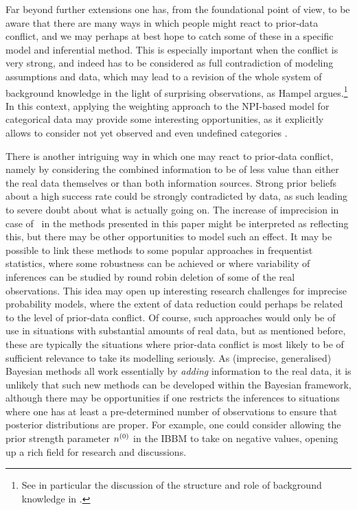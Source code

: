 Far beyond further extensions %
one has, from the foundational point of view, to be aware that there are
many ways in which people might react to prior-data conflict, and we
may perhaps at best hope to catch some of these in a specific
model and inferential method.
This is especially important when the conflict is very strong, and
indeed has to be considered as full contradiction of modeling
assumptions and data, which may lead to a revision of the whole
system of background knowledge in the light of surprising
observations, as Hampel argues.\footnote{See in particular the discussion of the
structure and role of background knowledge in \textcite{2009:hampel:knowledge}.}
In this context, applying the weighting approach to the NPI-based model
for categorical data \parencite{2009:Coolen:Augustin} may provide some
interesting opportunities, as it explicitly allows to consider not yet observed and
even undefined categories \parencite{2005:Coolen:Augustin}.

There is another intriguing way in which one may react to prior-data
conflict, namely by considering the combined information to be of
less value than either the real data themselves or than both
information sources. Strong prior beliefs about
a high success rate could be strongly contradicted by data, as such
leading to severe doubt about what is actually going on. The increase of
imprecision in case of \pdc\ in the methods presented in this paper
might be interpreted as reflecting this, but there may be other
opportunities to model such an effect. It may be possible to link these
methods to some popular approaches in frequentist statistics, where some robustness
can be achieved or where variability of inferences can be studied by
round robin deletion of some of the real observations. %
This idea may open up interesting research challenges for imprecise probability
models, where the extent of data reduction could perhaps be
related to the level of prior-data conflict. Of course, such
approaches would only be of use in situations with substantial
amounts of real data, but as mentioned before, these are typically
the situations where prior-data conflict is most likely to be of
sufficient relevance to take its modelling seriously. As (imprecise,
generalised) Bayesian methods all work essentially by \emph{adding}
information to the real data, it is unlikely that such new methods
can be developed within the Bayesian framework, although there may
be opportunities if one restricts the inferences to situations where
one has at least a pre-determined number of observations to ensure
that posterior distributions are proper. For example, one could
consider allowing the prior strength parameter
$n^{(0)}$ in the IBBM to take on negative values, opening up a rich
field for research and discussions.






